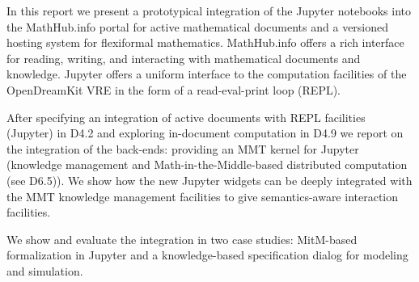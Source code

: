 
  In this report we present a prototypical integration of the Jupyter notebooks into the MathHub.info portal for active mathematical documents and a versioned hosting system for flexiformal mathematics.
  MathHub.info offers a rich interface for reading, writing, and interacting with mathematical documents and knowledge. Jupyter offers a uniform interface to the computation facilities of the OpenDreamKit VRE in the form of a read-eval-print loop (REPL). 

  After specifying an integration of active documents with REPL facilities (Jupyter) in D4.2 and exploring in-document computation in D4.9 we report on the integration of the back-ends: providing an MMT kernel for Jupyter (knowledge management and Math-in-the-Middle-based distributed computation (see D6.5)). We show how the new Jupyter widgets can be deeply integrated with the MMT knowledge management facilities to give semantics-aware interaction facilities.

  We show and evaluate the integration in two case studies: MitM-based formalization in Jupyter and a knowledge-based specification dialog for modeling and simulation. 

